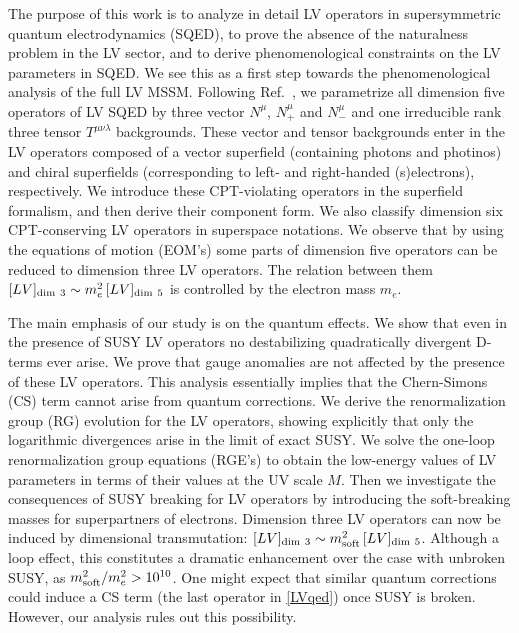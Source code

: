 \documentclass[12pt]{revtex4}
\begin{document}
The purpose of this work is to analyze in detail LV operators in 
supersymmetric quantum electrodynamics (SQED), to prove 
the absence of the naturalness problem in the LV sector, and to derive
phenomenological  constraints on the LV parameters in SQED.  
We see this as a first step towards the phenomenological analysis of the full
LV MSSM.  Following Ref.\ \cite{GrootNibbelink:2004za}, we
parametrize all dimension five operators of LV SQED by three vector 
$N^{\mu}$, $N^{\mu}_+$ and $N^{\mu}_-$ and one irreducible 
rank three tensor $T^{\mu\nu\lambda}$ backgrounds. 
These vector and tensor backgrounds enter in the LV
operators composed  of a vector superfield (containing photons and
photinos) and chiral superfields (corresponding to left- and
right-handed (s)electrons), respectively. 
We introduce these CPT-violating operators in the superfield
formalism, and then derive their component form. We also classify
dimension six CPT-conserving LV operators in superspace notations. 
We observe that by using the equations of
motion (EOM's) some parts of dimension five operators can be 
reduced to dimension three LV operators. The relation  
between them
$[LV]_{\rm dim~3} \sim m_e^2\, [LV]_{\rm dim~5}$ 
is controlled by the electron mass $m_e$. 


The main emphasis of our study is on the quantum effects. We show that
even in the presence of SUSY LV operators no destabilizing quadratically
divergent D-terms ever arise. We prove that gauge anomalies are
not affected by the presence of these LV operators. This analysis
essentially implies that the Chern-Simons (CS) term cannot arise from quantum
corrections. We derive the renormalization group (RG) evolution for the
LV operators, showing explicitly that only the logarithmic divergences
arise in the limit of exact SUSY. We solve the one-loop
renormalization group equations (RGE's)  to obtain the low-energy
values of LV parameters in terms of their values at the UV scale
$M$. 
Then we investigate the consequences of SUSY breaking for
LV operators by introducing the soft-breaking masses for superpartners of electrons.
Dimension three LV operators can now be induced by dimensional
transmutation: 
$[LV]_{\rm dim~3} \sim m_{\rm soft}^2 \, [LV]_{\rm dim~5}$. 
Although a loop effect, this constitutes a dramatic enhancement over
the case with unbroken SUSY, as $ m_{\rm soft}^2/m_e^2 > 10^{10}$.  
One might expect that similar quantum corrections could induce a CS
term (the last operator in \eqref{LVqed}) once SUSY is
broken. However, our analysis rules out this possibility. 
\end{document}
